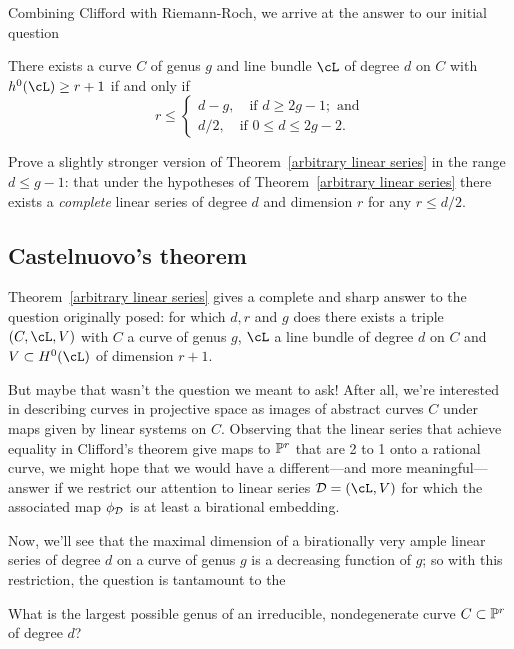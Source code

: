 Combining Clifford with Riemann-Roch, we arrive at the answer to our initial question

\begin{theorem}\label{arbitrary linear series}
There exists a curve $C$ of genus $g$ and line bundle $\cL$ of degree $d$ on $C$ with $h^0(\cL) \geq r+1$ if and only if
$$
r \leq
\begin{cases}
d-g, \quad \text{if } d \geq 2g-1; \text{ and} \\
d/2,  \quad \text{if } 0 \leq d \leq 2g-2.
\end{cases}
$$
\end{theorem}

\begin{exercise}
Prove a slightly stronger version of Theorem~\ref{arbitrary linear series} in the range $d \leq g-1$: that under the hypotheses of Theorem~\ref{arbitrary linear series} there exists a \emph{complete} linear series of degree $d$ and dimension $r$ for any $r \leq d/2$.
\end{exercise}

\subsection{Castelnuovo's theorem}

Theorem~\ref{arbitrary linear series} gives a complete and sharp answer to the question originally posed: for which $d,r$ and $g$ does there exists a triple $(C,\cL,V)$ with $C$ a curve of genus $g$, $\cL$ a line bundle of degree $d$ on $C$ and $V \subset H^0(\cL)$ of dimension $r+1$. 

But maybe that wasn't the question we meant to ask! After all, we're interested in describing curves in projective space as images of abstract curves $C$ under maps given by linear systems on $C$. Observing that the linear series that achieve equality in Clifford's theorem give maps to $\PP^r$ that are 2 to 1 onto a rational curve, we might hope that we would have a different---and more meaningful---answer if we  restrict our attention to linear series $\cD = (\cL,V)$ for which the associated map $\phi_\cD$ is at least a birational embedding. 

Now, we'll see that the maximal dimension of a birationally very ample linear series of degree $d$ on a curve of genus $g$ is a decreasing function of $g$; so with this restriction, the question is tantamount to the

\begin{question}
What is the largest possible genus of an irreducible, nondegenerate curve $C \subset \PP^r$ of degree $d$?
\end{question}

